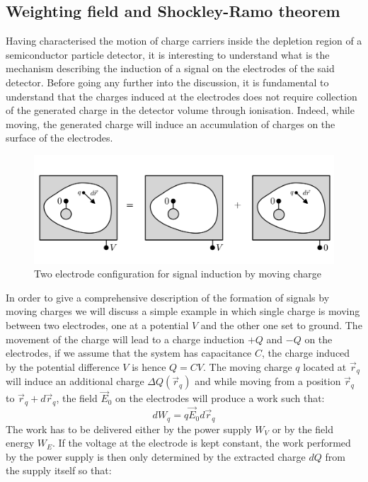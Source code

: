 		\subsection{Weighting field and Shockley-Ramo theorem}\label{subsec:2.2.2}
		Having characterised the motion of charge carriers inside the depletion region of a semiconductor particle detector, it is interesting to understand what is the mechanism describing the induction of a signal on the electrodes of the said detector. Before going any further into the discussion, it is fundamental to understand that the charges induced at the electrodes does not require collection of the generated charge in the detector volume through ionisation. Indeed, while moving, the generated charge will induce an accumulation of charges on the surface of the electrodes.
		\begin{figure}[h]
		\centering
		\includegraphics[width=0.7\linewidth]{files/two_electrode_shockleyramo}
		\caption{Two electrode configuration for signal induction by moving charge}
		\label{im:ShockleyRamo}
		\end{figure}
		In order to give a comprehensive description of the formation of signals by moving charges we will discuss a simple example in which single charge is moving between two electrodes, one at a potential $V$ and the other one set to ground. The movement of the charge will lead to a charge induction $+Q$ and $-Q$ on the electrodes, if we assume that the system has capacitance $C$, the charge induced by the potential difference $V$ is hence $Q = CV$. The moving charge $q$ located at $\vec{r}_q$ will induce an additional charge $\Delta Q(\vec{r}_q)$ and while moving from a position $\vec{r}_q$ to $\vec{r}_q + d\vec{r}_q$, the field $\vec{E}_0$ on the electrodes will produce a work such that: 
		\begin{equation}
			dW_q = q\vec{E}_0 d\vec{r}_q
		\end{equation}
		The work has to be delivered either by the power supply $W_V$ or by the field energy $W_E$. If the voltage at the electrode is kept constant, the work performed by the power supply is then only determined by the extracted charge $dQ$ from the supply itself so that:

